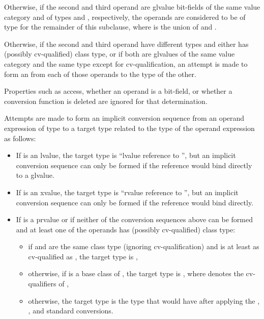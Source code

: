 \pnum
Otherwise, if the second and third operand are glvalue bit-fields
of the same value category and
of types   and  , respectively,
the operands are considered to be of type \cv{} 
for the remainder of this subclause,
where \cv{} is the union of  and .

\pnum
Otherwise, if the second and third operand have different types and
either has (possibly cv-qualified) class type, or if both
are glvalues of the same value category and the same type except for
cv-qualification, an attempt is made to
form an  from
each of those operands to the type of the other.
\begin{note}
Properties such as access, whether an operand is a bit-field, or whether
a conversion function is deleted are ignored for that determination.
\end{note}
Attempts are made to form an implicit conversion sequence
from an operand expression  of type 
to a target type related to the type 
of the operand expression  as follows:
\begin{itemize}
\item If  is an lvalue, the target type is
``lvalue reference to '',
but an implicit conversion sequence can only be formed
if the reference would bind directly
to a glvalue.

\item If  is an xvalue, the target type is
``rvalue reference to '',
but an implicit conversion sequence can only be formed
if the reference would bind directly.

\item If  is a prvalue or if neither of the conversion sequences above can be
formed and at least one of the operands has (possibly cv-qualified) class type:
\begin{itemize}
\item if  and  are the same class type
(ignoring cv-qualification) and
 is at least as cv-qualified as ,
the target type is ,

\item otherwise, if  is a base class of ,
the target type is  , where 
denotes the cv-qualifiers of ,

\item otherwise, the target type is the type that  would have
after applying the
,
, and
standard conversions.
\end{itemize}
\end{itemize}

